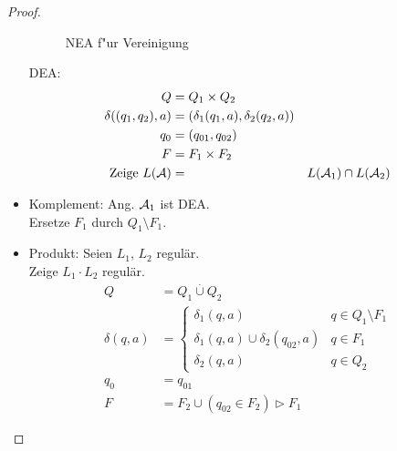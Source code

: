 \begin{proof}
\begin{itemize}
\begin{figure}[tp]
            \caption{\acs{NEA} f"ur Vereinigung}
            \label{fig:reg-closure-union}
        \end{figure}
		DEA:
		\begin{align*}
			Q &= Q_1\times Q_2\\
			\delta((q_1,q_2),a) &= (\delta_1(q_1,a),\delta_2(q_2,a))\\
			q_0 &= (q_{01},q_{02})\\
			F &= F_1\times F_2\\
			\text{Zeige }L(\mathcal{A}) &= &L(\mathcal{A}_1)\cap L(\mathcal{A}_2)
		\end{align*}
	\item Komplement: Ang. $\mathcal{A}_1$ ist \ac{DEA}.\\
		Ersetze $F_1$ durch $Q_1\setminus F_1$.
%
%
        \item Produkt: Seien $L_1$, $L_2$ regulär.\\
                Zeige $L_1\cdot L_2$ regulär.
                \begin{align*}
                        Q &= Q_1 \overset.\cup Q_2\\
                        \delta(q,a) &=
                                \begin{cases}
                                        \delta_1(q,a) & q\in Q_1\setminus F_1\\
                                        \delta_1(q,a)\cup\delta_2(q_{02},a) & q\in F_1\\
                                        \delta_2(q,a) & q\in Q_2
                                \end{cases}\\
                q_0& = q_{01}\\
                F &= F_2\cup(q_{02}\in F_2) \rhd F_1

\end{align*}
\end{itemize}
\end{proof}
